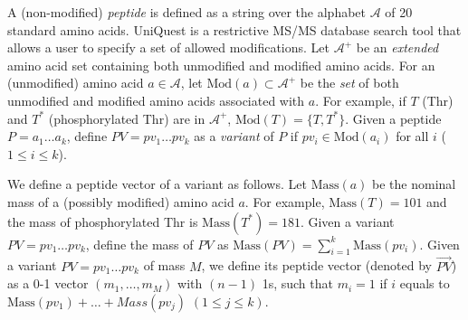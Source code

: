  A (non-modified) \emph{peptide} is defined as a string over the alphabet  $\mathcal{A}$ of 20 standard amino acids. UniQuest is a restrictive MS/MS database search tool that allows a user to specify a set of allowed modifications.
Let $\mathcal{A}^+$ be an {\em extended} amino acid set containing both unmodified and modified amino acids.
For an (unmodified) amino acid $a\in\mathcal{{A}}$, let $\textrm{Mod}(a) \subset \mathcal{A}^+$ be the \emph{set} of both unmodified and modified amino acids associated with $a$. 
For example, if $T$ (Thr) and $T^*$ (phosphorylated Thr) are in $\mathcal{A}^+$, $\textrm{Mod}(T)=\{T, T^*\}$.
Given a peptide $P=a_{1}\ldots a_{k}$, define $PV=pv_{1} \ldots pv_{k}$ as a \emph{variant} of $P$
if $pv_{i}\in\mathrm{Mod}(a_{i})$ for all $i$ ($1\leq i\leq k$).

We  define a peptide vector of a variant as follows.
Let $\textrm{Mass}(a)$ be the nominal mass of a (possibly modified) amino acid $a$.
For example, $\textrm{Mass}(T)=101$ and the mass of phosphorylated Thr is $\textrm{Mass}(T^*)=181$.
Given a variant $PV=pv_{1}\ldots pv_{k}$, define the mass of $PV$ as $\textrm{Mass}(PV)=\sum_{i=1}^{k}\textrm{Mass}(pv_{i})$.
Given a variant $PV=pv_{1}\ldots pv_{k}$ of mass $M$, we define its peptide vector (denoted
by $\vec{PV}$) as a 0-1 vector $(m_{1}, \ldots,  m_{M})$
with $(n-1)$ 1s, such that $m_{i}=1$ if $i$ equals to 
$\textrm{Mass}(pv_{1})+\ldots+{Mass}(pv_{j})$ $(1\leq j \leq k)$.





